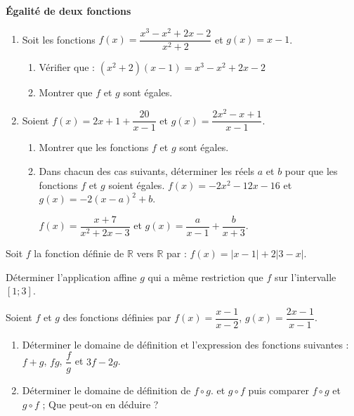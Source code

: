 \documentclass{article}
\begin{document}
 \quad \textbf{Égalité de deux fonctions}

\begin{enumerate}
    \item  Soit les fonctions \( f(x) = \dfrac{x^3 - x^2 + 2x - 2}{x^2 + 2} \) et \( g(x) = x - 1 \).

\begin{enumerate}
    \item Vérifier que :
\( (x^2 + 2)(x - 1) = x^3 - x^2 + 2x - 2 \)
    \item Montrer que \( f \) et \( g \) sont égales.
\end{enumerate}

\item Soient \( f(x) = 2x + 1 + \dfrac{20}{x - 1} \) et
\( g(x) = \dfrac{2x^2 - x + 1}{x - 1}. \)

\begin{enumerate}
\item Montrer que les fonctions \( f \) et \( g \) sont égales.
\item Dans chacun des cas suivants, déterminer les réels \( a \) et \( b \) pour que les fonctions \( f \) et \( g \) soient égales.
\( f(x) = -2x^2 - 12x - 16 \) et \( g(x) = -2(x - a)^2 + b \).

\( f(x) = \dfrac{x + 7}{x^2 + 2x - 3} \) et \( g(x) = \dfrac{a}{x - 1} + \dfrac{b}{x + 3} \).
\end{enumerate}
\end{enumerate}

 \quad Soit \( f \) la fonction définie de \( \mathbb{R} \) vers \( \mathbb{R} \) par :  
\( f(x) = |x - 1| + 2 |3 - x| \).  

Déterminer l’application affine \( g \) qui a même restriction que \( f \) sur l’intervalle \([1;3]\).

\bigskip

 \quad Soient \( f \) et \( g \) des fonctions définies par  
\( f(x) = \dfrac{x - 1}{x - 2} \), \( g(x) = \dfrac{2x - 1}{x - 1} \).

\begin{enumerate}
    \item Déterminer le domaine de définition et l’expression des fonctions suivantes : \( f + g \), \( fg \), \( \dfrac{f}{g} \) et \( 3f - 2g \).
    \item Déterminer le domaine de définition de \( f \circ g \). et \( g \circ f \) puis comparer \( f \circ g \) et \( g \circ f \) ; Que peut-on en déduire ?
\end{enumerate}
\end{document}
